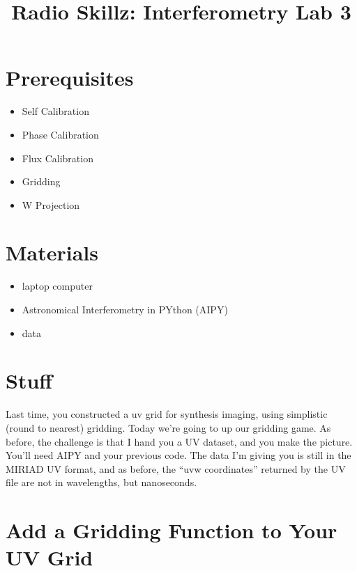 \documentclass[11pt]{article}
\begin{document}
\title{Radio Skillz: Interferometry Lab 3}

\maketitle

\section*{Prerequisites}

\begin{itemize}
\item Self Calibration
\item Phase Calibration
\item Flux Calibration
\item Gridding
\item W Projection
\end{itemize}

\section*{Materials}

\begin{itemize}
\item laptop computer
\item Astronomical Interferometry in PYthon (AIPY)
\item data
\end{itemize}

\section*{Stuff}

Last time, you constructed a uv grid for synthesis imaging, using simplistic (round to nearest) gridding.
Today we're going to up our gridding game.  As before, the challenge is
that I hand you a UV dataset, and you make the picture.  You'll need AIPY and your previous code.
The data I'm giving you is still in the MIRIAD UV format, and as before,
the ``uvw coordinates'' returned by the UV file are not in wavelengths,
but nanoseconds.

\section{Add a Gridding Function to Your UV Grid}
\end{document}
